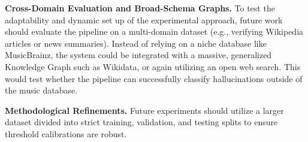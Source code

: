 \textbf{Cross-Domain Evaluation and Broad-Schema Graphs.} To test the adaptability and dynamic set up of the experimental approach, future work should evaluate the pipeline on a multi-domain dataset (e.g., verifying Wikipedia articles or news summaries). Instead of relying on a niche database like MusicBrainz, the system could be integrated with a massive, generalized Knowledge Graph such as Wikidata, or again utilizing an open web search. This would test whether the pipeline can successfully classify hallucinations outside of the music database.

\textbf{Methodological Refinements.} Future experiments should utilize a larger dataset divided into strict training, validation, and testing splits to ensure threshold calibrations are robust. 